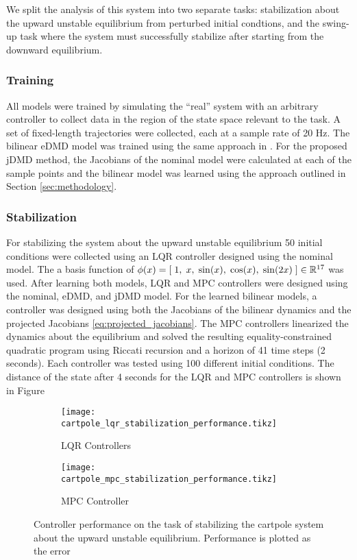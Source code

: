 \documentclass{article}
\begin{document}
We split the analysis of this system into two separate tasks: stabilization about the upward
unstable equilibrium from perturbed initial condtions, and the swing-up task where the 
system must successfully stabilize after starting from the downward equilibrium.

\subsubsection{Training}

All models were trained by simulating the ``real'' system with an arbitrary controller to 
collect data in the region of the state space relevant to the task. A set of fixed-length 
trajectories were collected, each at a sample rate of 20 Hz. The bilinear eDMD model was
trained using the same approach in \cite{Folkestad2021}. For the proposed jDMD method, the
Jacobians of the nominal model were calculated at each of the sample points and the bilinear
model was learned using the approach outlined in Section \ref{sec:methodology}.

\subsubsection{Stabilization}

For stabilizing the system about the upward unstable equilibrium 50 initial conditions were
collected using an LQR controller designed using the nominal model. The a basis function of 
$\phi(x) = [\; 1,\; x,\; \sin(x),\; \cos(x),\; \sin(2x)\; ] \in \mathbb{R}^{17}$ was used. After
learning both models, LQR and MPC controllers were designed using the nominal, eDMD, and
jDMD model. For the learned bilinear models, a controller was designed using both the  
Jacobians of the bilinear dynamics and the projected Jacobians
\eqref{eq:projected_jacobians}. The MPC controllers linearized the dynamics about the 
equilibrium and solved the resulting equality-constrained quadratic program using Riccati 
recursion and a horizon of 41 time steps (2 seconds). Each controller was tested using 100
different initial conditions. The distance of the state after 4 seconds for the LQR and MPC
controllers is shown in Figure

\begin{figure}
  \centering
  \begin{subfigure}[b]{0.40\textwidth}
    \texttt{[image: cartpole\_lqr\_stabilization\_performance.tikz]}
    \caption{LQR Controllers}
  \end{subfigure}
  \begin{subfigure}[b]{0.59\textwidth}
    \texttt{[image: cartpole\_mpc\_stabilization\_performance.tikz]}
    \caption{MPC Controller}
  \end{subfigure}
  \label{fig:cartpole_stabilization}
  \caption{Controller performance on the task of stabilizing the cartpole system about the 
  upward unstable equilibrium. Performance is plotted as the error }
\end{figure}
\end{document}

